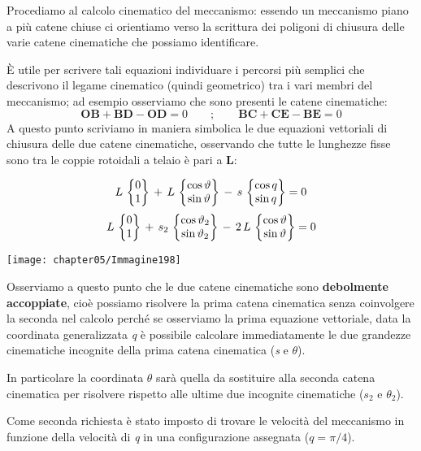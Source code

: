 Procediamo al calcolo cinematico del meccanismo: essendo un meccanismo piano a più catene chiuse ci orientiamo verso la scrittura dei poligoni di chiusura delle varie catene cinematiche che possiamo identificare.

È utile per scrivere tali equazioni individuare i percorsi più semplici che descrivono il legame cinematico (quindi geometrico) tra i vari membri del meccanismo; ad esempio osserviamo che sono presenti le catene cinematiche:
\[\mathbf{OB} + \mathbf{BD}  - \mathbf{OD} = 0\qquad;\qquad \mathbf{BC}  + \mathbf{CE} -\mathbf{BE} = 0\]
A questo punto scriviamo in maniera simbolica le due equazioni vettoriali di chiusura delle due catene cinematiche, osservando che tutte le lunghezze fisse sono tra le coppie rotoidali a telaio è pari a \textbf{L}:

\begin{minipage}{.65\textwidth}
\[L\,\begin{Bmatrix}0\\1\end{Bmatrix}\,+\,L\,\begin{Bmatrix}\cos{\vartheta}\\\sin{\vartheta}\end{Bmatrix}\,-\,s\,\begin{Bmatrix}\cos{q}\\\sin{q}\end{Bmatrix}=0\]
\[L\,\begin{Bmatrix}0\\1\end{Bmatrix}\,+\,s_2\,\begin{Bmatrix}\cos{\vartheta_2}\\\sin{\vartheta_2}\end{Bmatrix}\,-\,2\,L\,\begin{Bmatrix}\cos{\vartheta}\\\sin{\vartheta}\end{Bmatrix} = 0\]
\end{minipage}
\hfill
\begin{minipage}{.3\textwidth}
\centering
\texttt{[image: chapter05/Immagine198]}
\end{minipage}

Osserviamo a questo punto che le due catene cinematiche sono \textbf{debolmente accoppiate}, cioè possiamo risolvere la prima catena cinematica senza coinvolgere la seconda nel calcolo perché se osserviamo la prima equazione vettoriale, data la coordinata generalizzata \emph{q} è possibile calcolare immediatamente le due grandezze cinematiche incognite della prima catena cinematica (\emph{s} e $\theta$).

In particolare la coordinata $\theta$ sarà quella da sostituire alla seconda catena cinematica per risolvere rispetto alle ultime due incognite cinematiche ($s_2$ e $\theta_2$).

Come seconda richiesta è stato imposto di trovare le velocità del meccanismo in funzione della velocità di \emph{q} in una configurazione assegnata ($q = \pi / 4$).

